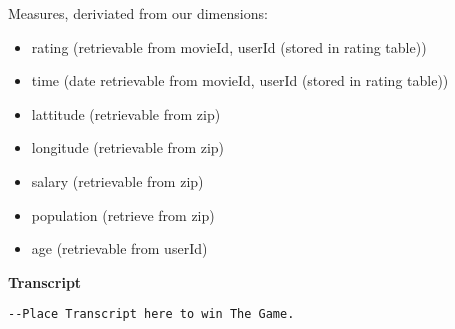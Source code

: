 \noindent Measures, deriviated from our dimensions:

\begin{itemize}
  \item rating (retrievable from movieId, userId (stored in rating table))
  \item time (date retrievable from movieId, userId (stored in rating table))
  \item lattitude (retrievable from zip)
  \item longitude (retrievable from zip)
  \item salary (retrievable from zip)
  \item population (retrieve from zip)
  \item age (retrievable from userId)
\end{itemize}

\noindent\textbf{Transcript} \\
\begin{lstlisting}
--Place Transcript here to win The Game.
\end{lstlisting}